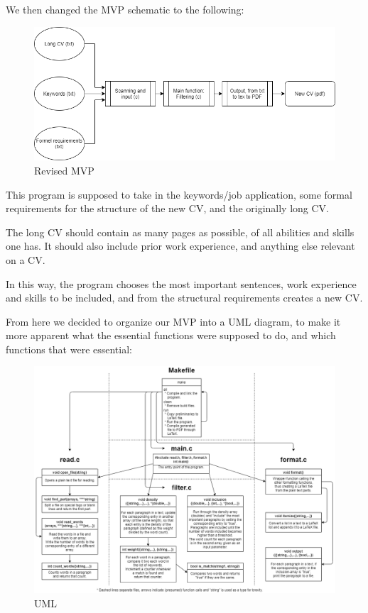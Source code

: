 We then changed the MVP schematic to the following:
\begin{figure}[H]
  \centering
  \includegraphics[scale = 0.6]{figures/Program_process_diagram.png}
  \caption{Revised MVP}
\end{figure}
This program is supposed to take in the keywords/job application, some formal requirements for
the structure of the new CV, and the originally long CV.
 
The long CV should contain as many pages as possible, of all abilities and skills one has.
It should also include prior work experience, and anything else relevant on a CV. 

In this way, the program chooses the most important sentences, work experience and skills to be included,
and from the structural requirements creates a new CV.

From here we decided to organize our MVP into a UML diagram, to make it more apparent
what the essential functions were supposed to do, and which functions that were essential:
\begin{figure}[H]
  \raggedright
  \hspace*{-1in}
  \includegraphics[scale = 0.50,left]{figures/UML}
  \caption{UML}
  \label{fig:UML}
\end{figure}
\newpage

